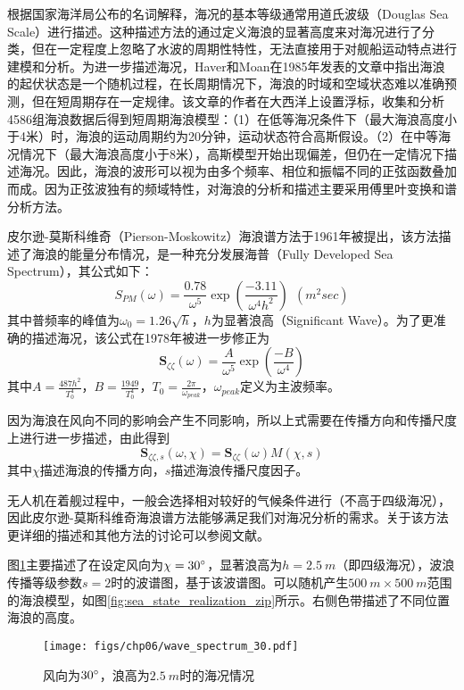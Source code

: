 根据国家海洋局公布的名词解释，海况的基本等级通常用道氏波级（Douglas Sea Scale）进行描述\cite{sea_state}。这种描述方法的通过定义海浪的显著高度来对海况进行了分类，但在一定程度上忽略了水波的周期性特性，无法直接用于对舰船运动特点进行建模和分析。为进一步描述海况，Haver和Moan在1985年发表的文章\cite{haver1983some}中指出海浪的起伏状态是一个随机过程，在长周期情况下，海浪的时域和空域状态难以准确预测，但在短周期存在一定规律。该文章的作者在大西洋上设置浮标，收集和分析4586组海浪数据后得到短周期海浪模型：（1）在低等海况条件下（最大海浪高度小于4米）时，海浪的运动周期约为20分钟，运动状态符合高斯假设。（2）在中等海况情况下（最大海浪高度小于8米），高斯模型开始出现偏差，但仍在一定情况下描述海况。因此，海浪的波形可以视为由多个频率、相位和振幅不同的正弦函数叠加而成。因为正弦波独有的频域特性，对海浪的分析和描述主要采用傅里叶变换和谱分析方法。

皮尔逊-莫斯科维奇（Pierson-Moskowitz）海浪谱方法于1961年被提出，该方法描述了海浪的能量分布情况，是一种充分发展海普（Fully Developed Sea Spectrum），其公式如下：
\begin{equation}
 S_{PM}(\omega) =\frac{0.78}{\omega^5}\exp(\frac{-3.11}{\omega^4h^2})\ \ (m^2sec)
\end{equation}
 其中普频率的峰值为$\omega_0=1.26\sqrt{h}$，$h$为显著浪高（Significant Wave）。为了更准确的描述海况，该公式在1978年被进一步修正为
\begin{equation}
\mathbf{S}_{\zeta \zeta}(\omega) = \frac{A}{\omega^5}\exp(\frac{-B}{\omega^4})
\end{equation}
其中$A=\frac{487h^2}{T_0^4}$，$B=\frac{1949}{T_0^4}$，$T_0=\frac{2\pi}{\omega_{peak}}$，$\omega_{peak}$定义为主波频率。

因为海浪在风向不同的影响会产生不同影响，所以上式需要在传播方向和传播尺度上进行进一步描述，由此得到
\begin{equation}
\mathbf{S}_{\zeta\zeta,s}(\omega,\chi) = \mathbf{S}_{\zeta\zeta}(\omega)M(\chi,s)
\end{equation}
其中$\chi$描述海浪的传播方向，$s$描述海浪传播尺度因子。

无人机在着舰过程中，一般会选择相对较好的气候条件进行（不高于四级海况），因此皮尔逊-莫斯科维奇海浪谱方法能够满足我们对海况分析的需求。关于该方法更详细的描述和其他方法的讨论可以参阅文献\cite{perez2002simple}。
 
图\ref{fig:wave_spectrum_30}主要描述了在设定风向为$\chi =30\degree$，显著浪高为$h  =2.5\ m$（即四级海况），波浪传播等级参数$s=2$时的波谱图，基于该波谱图。可以随机产生$500\ m \times 500\ m$范围的海浪模型，如图\ref{fig:sea_state_realization_zip}所示。右侧色带描述了不同位置海浪的高度。
 \begin{figure}[!ht]
 	\centering
 	\texttt{[image: figs/chp06/wave\_spectrum\_30.pdf]}	
 	\caption{风向为$30\degree$，浪高为$2.5\ m$时的海况情况}
 	\label{fig:wave_spectrum_30}
 \end{figure}

